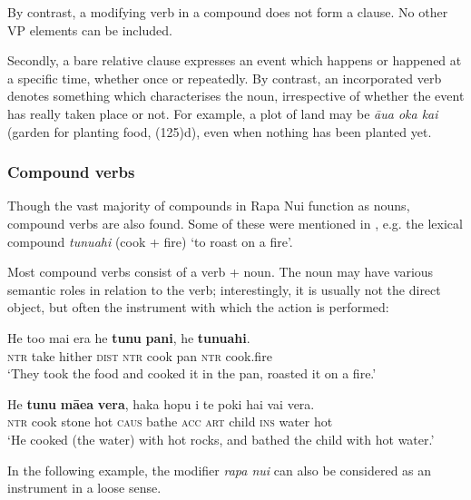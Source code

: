 By contrast, a modifying verb in a compound does not form a clause. No other VP elements can be included. 

Secondly, a bare relative clause expresses an event which happens or happened at a specific time, whether once or repeatedly. By contrast, an incorporated verb denotes something which characterises the noun, irrespective of whether the event has really taken place or not. For example, a plot of land may be \textit{{\ꞌ}āua {\ꞌ}oka kai} (garden for planting food, (125)d), even when nothing has been planted yet. 

\subsubsection[Compound verbs]{Compound verbs}\label{sec:5.7.2.4}

Though the vast majority of compounds in Rapa Nui function as nouns, compound verbs are also found. Some of these were mentioned in , e.g. the lexical compound \textit{tunuahi} (cook + fire) ‘to roast on a fire’. 

Most compound verbs consist of a verb + noun. The noun may have various semantic roles in relation to the verb; interestingly, it is usually not the direct object, but often the instrument with which the action is performed:

\ea\label{ex:5.132}
\gll He to{\ꞌ}o mai era he \textbf{tunu} \textbf{pani}, he \textbf{tunuahi}. \\
\textsc{ntr} take hither \textsc{dist} \textsc{ntr} cook pan \textsc{ntr} cook.fire \\

\glt 
‘They took the food and cooked it in the pan, roasted it on a fire.’ \textstyleExampleref{[R107.049]} 
\z

\ea\label{ex:5.133}
\gll He \textbf{tunu} \textbf{mā{\ꞌ}ea} \textbf{vera}, haka hopu i te poki hai vai vera. \\
\textsc{ntr} cook stone hot \textsc{caus} bathe \textsc{acc} \textsc{art} child \textsc{ins} water hot \\

\glt
‘He cooked (the water) with hot rocks, and bathed the child with hot water.’ \textstyleExampleref{[Mtx-1-07.016]}
\z

In the following example, the modifier \textit{rapa nui} can also be considered as an instrument in a loose sense.


